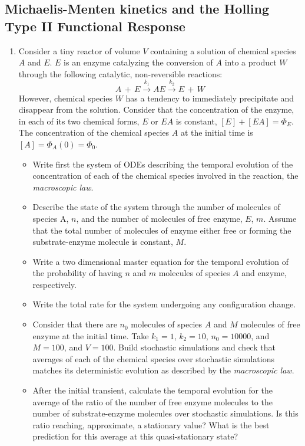 \documentclass{article}
\begin{document}
\subsection*{Michaelis-Menten kinetics and the Holling Type II Functional Response}
\begin{enumerate}
\item Consider a tiny reactor of volume $V$ containing a solution of chemical species $A$ and $E$. $E$ is an enzyme catalyzing the conversion of $A$ into a product $W$ through the following catalytic, non-reversible reactions:
\begin{equation}
A \,+ \,E  \xrightarrow{k_1} AE \xrightarrow{k_2} E \,+\, W \nonumber
\end{equation}    
However, chemical species $W$ has a tendency to immediately precipitate and disappear from the solution. Consider that the concentration of the enzyme, in each of its two chemical forms, $E$ or $EA$ is constant, $[E] + [EA] = \Phi_E$. The concentration of the chemical species $A$ at the initial time is $[A]= \Phi_A(0) = \Phi_0$. 
\begin{itemize}
\item Write first the system of ODEs describing the temporal evolution of the concentration of each of the chemical species involved in the reaction, the {\em macroscopic law}. 
\item Describe the state of the system through the number of molecules of species A, $n$, and the number of molecules of free enzyme, $E$, $m$. Assume that the total number of molecules of enzyme either free or forming the substrate-enzyme molecule is constant, $M$.   
\item Write a two dimensional master equation for the temporal evolution of the probability of having $n$ and $m$ molecules of species $A$ and enzyme, respectively. 
\item Write the total rate for the system undergoing any configuration change. 
\item Consider that there are $n_0$ molecules of species $A$ and $M$ molecules of free enzyme at the initial time. Take $k_1 = 1$, $k_2 = 10$, $n_0 = 10000$, and $M=100$, and $V=100$. Build stochastic simulations and check that averages of each of the chemical species over stochastic simulations matches its deterministic evolution as described by the {\em macroscopic law}.  
\item After the initial transient, calculate the temporal evolution for the average of the ratio of the number of free enzyme molecules to the number of substrate-enzyme molecules over stochastic simulations. Is this ratio reaching, approximate, a stationary value? What is the best prediction for this average at this quasi-stationary state?  
\end{itemize}
\end{enumerate}


\end{document}
